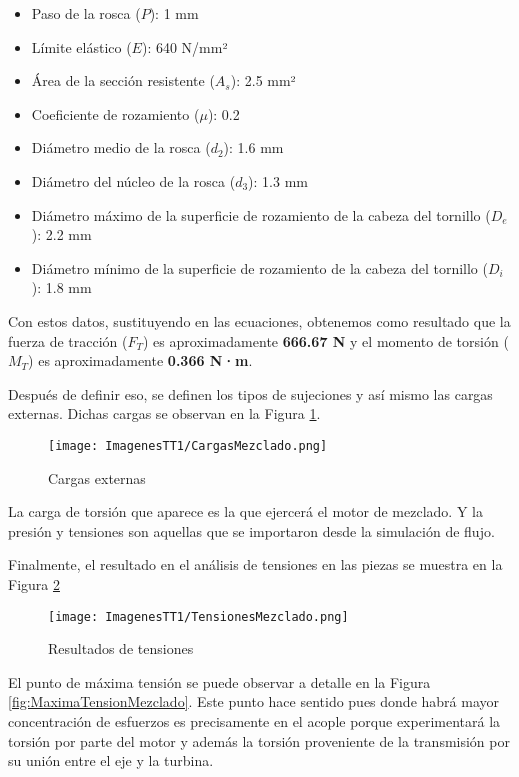 \documentclass[14pt,oneside]{extarticle} %
\begin{document}
\begin{itemize}
    \item Paso de la rosca (\( P \)): 1 mm
    \item Límite elástico (\( E \)): 640 N/mm²
    \item Área de la sección resistente (\( A_s \)): 2.5 mm²
    \item Coeficiente de rozamiento (\( \mu \)): 0.2
    \item Diámetro medio de la rosca (\( d_2 \)): 1.6 mm
    \item Diámetro del núcleo de la rosca (\( d_3 \)): 1.3 mm
    \item Diámetro máximo de la superficie de rozamiento de la cabeza del tornillo (\( D_e \)): 2.2 mm
    \item Diámetro mínimo de la superficie de rozamiento de la cabeza del tornillo (\( D_i \)): 1.8 mm
\end{itemize}

Con estos datos, sustituyendo en las ecuaciones, obtenemos como resultado que la fuerza de tracción (\( F_T \)) es aproximadamente \textbf{666.67 N} y
el momento de torsión (\( M_T \)) es aproximadamente \textbf{0.366 N·m}.

Después de definir eso, se definen los tipos de sujeciones y así mismo las cargas externas. Dichas cargas se observan en la Figura \ref{fig:CargasMezclado}.

\begin{figure}[H]
    \centering
    \texttt{[image: ImagenesTT1/CargasMezclado.png]}
    \caption{Cargas externas}
    \label{fig:CargasMezclado}
\end{figure}

La carga de torsión que aparece es la que ejercerá el motor de mezclado. Y la presión y tensiones son aquellas que se importaron desde la simulación de flujo.

Finalmente, el resultado en el análisis de tensiones en las piezas se muestra en la Figura \ref{fig:TensionesMezclado}

\begin{figure}[H]
    \centering
    \texttt{[image: ImagenesTT1/TensionesMezclado.png]}
    \caption{Resultados de tensiones}
    \label{fig:TensionesMezclado}
\end{figure}

El punto de máxima tensión se puede observar a detalle en la Figura \ref{fig:MaximaTensionMezclado}. Este punto hace sentido pues donde habrá mayor concentración de esfuerzos es precisamente en el acople porque experimentará la torsión por parte del motor y además la torsión proveniente de la transmisión por su unión entre el eje y la turbina.
\end{document}
